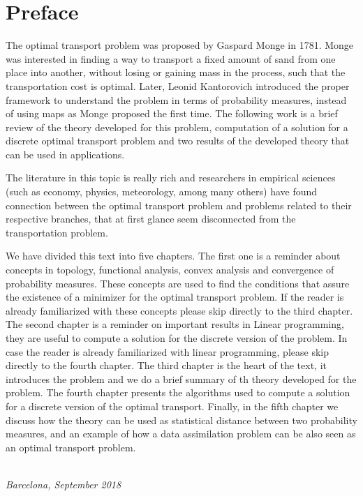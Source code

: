 \chapter*{Preface}

The optimal transport problem was proposed by Gaspard Monge in 1781. Monge was interested in finding a way to transport a fixed amount of sand from one place into another, without losing or gaining mass in the process, such that the transportation cost is optimal. Later, Leonid Kantorovich introduced the proper framework to understand the problem in terms of probability measures, instead of using maps as Monge proposed the first time. The following work is a brief review of the theory developed for this problem, computation of a solution for a discrete optimal transport problem and two results of the developed theory that can be used in applications. 

The literature in this topic is really rich and researchers in empirical sciences (such as economy, physics, meteorology, among many others) have found connection between the optimal transport problem and problems related to their respective branches, that at first glance seem disconnected from the transportation problem. 

We have divided this text into five chapters. The first one is a reminder about concepts in topology, functional analysis, convex analysis and convergence of probability measures. These concepts are used to find the conditions that assure the existence of a minimizer for the optimal transport problem. If the reader is already familiarized with these concepts please skip directly to the third chapter. The second chapter is a reminder on important results in Linear programming, they are useful to compute a solution for the discrete version of the problem. In case the reader is already familiarized with linear programming, please skip directly to the fourth chapter. The third chapter is the heart of the text, it introduces the problem and we do a brief summary of th theory developed for the problem. The fourth chapter presents the algorithms used to compute a solution for a discrete version of the optimal transport. Finally, in the fifth chapter we discuss how the theory can be used as statistical distance between two probability measures, and an example of how a data assimilation problem can be also seen as an optimal transport problem.

\begin{flushright}
{\makeatletter\itshape
    \@author \\
    Barcelona, September 2018
\makeatother}
\end{flushright}

